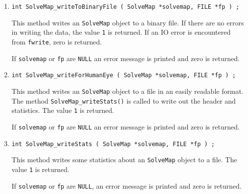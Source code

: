 \begin{enumerate}
\item
\begin{verbatim}
int SolveMap_writeToBinaryFile ( SolveMap *solvemap, FILE *fp ) ;
\end{verbatim}
\par
This method writes an {\tt SolveMap} object to a binary file.
If there are no errors in writing the data, 
the value {\tt 1} is returned.
If an IO error is encountered from {\tt fwrite}, zero is returned.
\par {}
If {\tt solvemap} or {\tt fp} are {\tt NULL} an error message 
is printed and zero is returned.
\item
\begin{verbatim}
int SolveMap_writeForHumanEye ( SolveMap *solvemap, FILE *fp ) ;
\end{verbatim}
\par
This method writes an {\tt SolveMap} object to a file in an easily
readable format.
The method {\tt SolveMap\_writeStats()} is called to write out the
header and statistics. 
The value {\tt 1} is returned.
\par {}
If {\tt solvemap} or {\tt fp} are {\tt NULL} an error message 
is printed and zero is returned.
\item
\begin{verbatim}
int SolveMap_writeStats ( SolveMap *solvemap, FILE *fp ) ;
\end{verbatim}
\par
This method writes some statistics about an {\tt SolveMap} object to a file.
The value {\tt 1} is returned.
\par {}
If {\tt solvemap} or {\tt fp} are {\tt NULL},
an error message is printed and zero is returned.
\end{enumerate}
